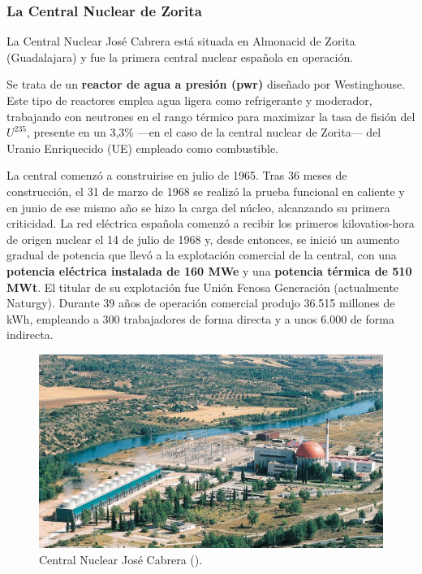 \subsubsection{La Central Nuclear de Zorita}

La Central Nuclear José Cabrera está situada en Almonacid de Zorita (Guadalajara) y fue la primera central nuclear española en operación.

Se trata de un \textbf{reactor de agua a presión (\acrshort{pwr})} diseñado por Westinghouse. Este tipo de reactores emplea agua ligera como refrigerante y moderador, trabajando con neutrones en el rango térmico para maximizar la tasa de fisión del $U^{235}$, presente en un 3,3\% ---en el caso de la central nuclear de Zorita--- del Uranio Enriquecido (UE) empleado como combustible.

La central comenzó a construirise en julio de 1965. Tras 36 meses de construcción, el 31 de marzo de 1968 se realizó la prueba funcional en caliente y en junio de ese mismo año se hizo la carga del núcleo, alcanzando su primera criticidad. La red eléctrica española comenzó a recibir los primeros kilovatios-hora de origen nuclear el 14 de julio de 1968 y, desde entonces, se inició un aumento gradual de potencia que llevó a la explotación comercial de la central, con una \textbf{potencia eléctrica instalada de 160 MWe} y una \textbf{potencia térmica de 510 MWt}. El titular de su explotación fue Unión Fenosa Generación (actualmente Naturgy). Durante 39 años de operación comercial produjo 36.515 millones de kWh, empleando a 300 trabajadores de forma directa y a unos 6.000 de forma indirecta.

\begin{figure}[h]
    \centering
    \includegraphics[width=\textwidth]{content/figures/zorita.jpg}
    \caption{Central Nuclear José Cabrera (\cite{sne_recursos_prensa}).}
    \label{fig:zorita}
\end{figure}

